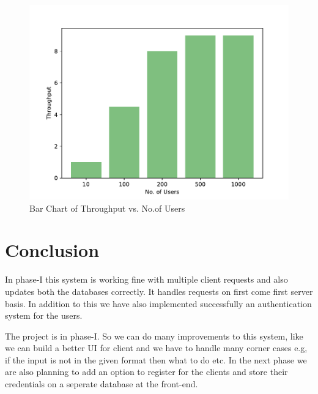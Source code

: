 \documentclass[11pt]{article}
\begin{document}
				\begin{figure}[ht]
					\begin{center}
						\includegraphics[scale=0.5]{plot5.pdf}
						\caption{\label{fig:plot5} Bar Chart of Throughput vs. No.of Users}
					\end{center}
				\end{figure}
	
	\clearpage							
	\section{Conclusion}
		In phase-I this system is working fine with multiple client requests and
		also updates both the databases correctly. It handles requests on first come first
		server basis. In addition to this we have also implemented successfully an
		authentication system for the users.
		
		The project is in phase-I. So we can do many improvements to this
		system, like we can build a better UI for client and we have to handle many
		corner cases e.g, if the input is not in the given format then what to do etc. In
		the next phase we are also planning to add an option to register for the clients
		and store their credentials on a seperate database at the front-end.
\end{document}
